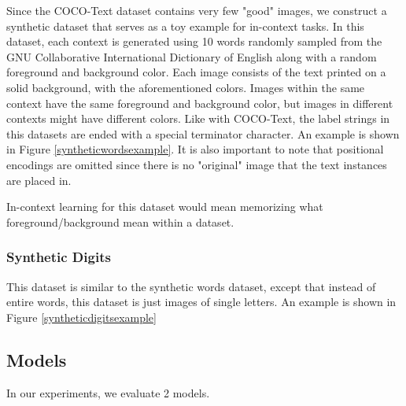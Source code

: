 Since the COCO-Text dataset contains very few "good" images, we construct a
synthetic dataset that serves as a toy example for in-context tasks.
In this dataset, each context is generated using 10 words randomly sampled from
the GNU Collaborative International Dictionary of English\cite{gcide} along with
a random foreground and background color.
Each image consists of the text printed on a solid background, with the
aforementioned colors.
Images within the same context have the same foreground and background color,
but images in different contexts might have different colors.
Like with COCO-Text, the label strings in this datasets are ended with a special
terminator character.
An example is shown in Figure \ref{syntheticwordsexample}.
It is also important to note that positional encodings are omitted since there
is no "original" image that the text instances are placed in.

In-context learning for this dataset would mean memorizing what
foreground/background mean within a dataset.

\subsubsection{Synthetic Digits}
This dataset is similar to the synthetic words dataset, except that instead of
entire words, this dataset is just images of single letters.
An example is shown in Figure \ref{syntheticdigitsexample}

\subsection{Models}
In our experiments, we evaluate 2 models.

